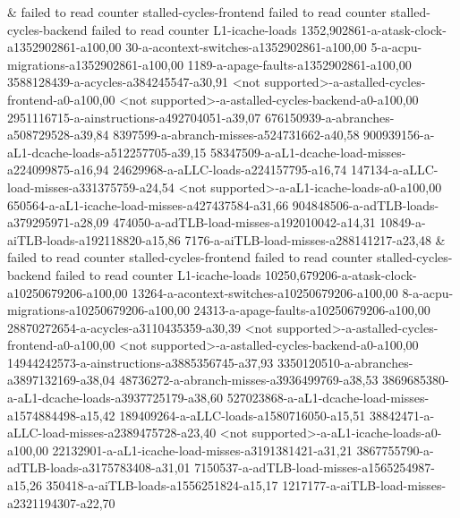 &
failed to read counter stalled-cycles-frontend failed to read counter stalled-cycles-backend failed to read counter L1-icache-loads 1352,902861-a-atask-clock-a1352902861-a100,00 30-a-acontext-switches-a1352902861-a100,00 5-a-acpu-migrations-a1352902861-a100,00 1189-a-apage-faults-a1352902861-a100,00 3588128439-a-acycles-a384245547-a30,91 <not supported>-a-astalled-cycles-frontend-a0-a100,00 <not supported>-a-astalled-cycles-backend-a0-a100,00 2951116715-a-ainstructions-a492704051-a39,07 676150939-a-abranches-a508729528-a39,84 8397599-a-abranch-misses-a524731662-a40,58 900939156-a-aL1-dcache-loads-a512257705-a39,15 58347509-a-aL1-dcache-load-misses-a224099875-a16,94 24629968-a-aLLC-loads-a224157795-a16,74 147134-a-aLLC-load-misses-a331375759-a24,54 <not supported>-a-aL1-icache-loads-a0-a100,00 650564-a-aL1-icache-load-misses-a427437584-a31,66 904848506-a-adTLB-loads-a379295971-a28,09 474050-a-adTLB-load-misses-a192010042-a14,31 10849-a-aiTLB-loads-a192118820-a15,86 7176-a-aiTLB-load-misses-a288141217-a23,48
&
failed to read counter stalled-cycles-frontend failed to read counter stalled-cycles-backend failed to read counter L1-icache-loads 10250,679206-a-atask-clock-a10250679206-a100,00 13264-a-acontext-switches-a10250679206-a100,00 8-a-acpu-migrations-a10250679206-a100,00 24313-a-apage-faults-a10250679206-a100,00 28870272654-a-acycles-a3110435359-a30,39 <not supported>-a-astalled-cycles-frontend-a0-a100,00 <not supported>-a-astalled-cycles-backend-a0-a100,00 14944242573-a-ainstructions-a3885356745-a37,93 3350120510-a-abranches-a3897132169-a38,04 48736272-a-abranch-misses-a3936499769-a38,53 3869685380-a-aL1-dcache-loads-a3937725179-a38,60 527023868-a-aL1-dcache-load-misses-a1574884498-a15,42 189409264-a-aLLC-loads-a1580716050-a15,51 38842471-a-aLLC-load-misses-a2389475728-a23,40 <not supported>-a-aL1-icache-loads-a0-a100,00 22132901-a-aL1-icache-load-misses-a3191381421-a31,21 3867755790-a-adTLB-loads-a3175783408-a31,01 7150537-a-adTLB-load-misses-a1565254987-a15,26 350418-a-aiTLB-loads-a1556251824-a15,17 1217177-a-aiTLB-load-misses-a2321194307-a22,70

